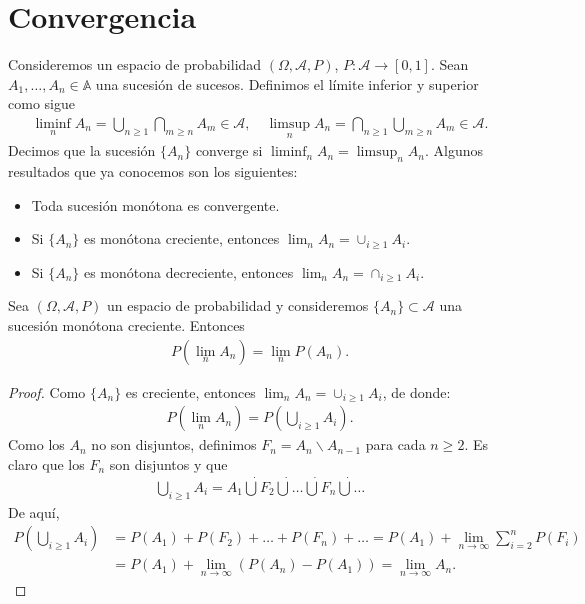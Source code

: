\chapter{Convergencia}
\noindent Consideremos un espacio de probabilidad $(\Omega, \mathcal{A}, P)$, $P : \mathcal{A} \longrightarrow [0,1]$. Sean $A_1,\ldots,A_n \in \mathbb{A}$ una sucesión de sucesos. Definimos el límite inferior y superior como sigue
\begin{align*}
    \liminf_{n} A_n = \bigcup_{n \ge 1} \bigcap_{m \ge n} A_m \in \mathcal{A}, \quad
    \limsup_{n} A_n = \bigcap_{n \ge 1} \bigcup_{m \ge n} A_m \in \mathcal{A}.
\end{align*}
Decimos que la sucesión $\{A_n\}$ converge si $\liminf_{n} A_n = \limsup_{n} A_n$. Algunos resultados que ya conocemos son los siguientes:
\begin{itemize}
    \item Toda sucesión monótona es convergente.
    \item Si $\{A_n\}$ es monótona creciente, entonces $\lim_{n} A_n = \cup_{i\ge1} A_i$.
    \item Si $\{A_n\}$ es monótona decreciente, entonces $\lim_{n} A_n = \cap_{i\ge1} A_i$.
\end{itemize}
\begin{teo}
    Sea $(\Omega,\mathcal{A},P)$ un espacio de probabilidad y consideremos $\{A_n\} \subset \mathcal{A}$ una sucesión monótona creciente. Entonces
    \begin{align*}
        P\left( \lim_n A_n \right) = \lim_n P(A_n).
    \end{align*}
\end{teo}

\begin{proof}
    Como $\{A_n\}$ es creciente, entonces $\lim_{n} A_n = \cup_{i\ge1} A_i$, de donde:
    \begin{align*}
        P\left( \lim_n A_n \right) = P\left( \bigcup_{i\ge1} A_i \right).
    \end{align*}
    Como los $A_n$ no son disjuntos, definimos $F_n = A_n \backslash A_{n-1}$ para cada $n \ge 2$. Es claro que los $F_n$ son disjuntos y que
    \begin{align*}
        \bigcup_{i\ge1} A_i = A_1 \dot \bigcup F_2 \dot \bigcup \ldots \dot \bigcup F_n \dot \bigcup \ldots
    \end{align*}
    De aquí,
    \begin{align*}
        P \left( \bigcup_{i \ge 1} A_i\right) &= P(A_1) + P(F_2) + \ldots + P(F_n) + \ldots 
        = P(A_1) + \lim_{n \to \infty} \sum_{i=2}^{n} P(F_i) \\
        &= P(A_1) + \lim_{n \to \infty} (P(A_n) - P(A_1)) = \lim_{n \to \infty} A_n.
    \end{align*}
\end{proof}

